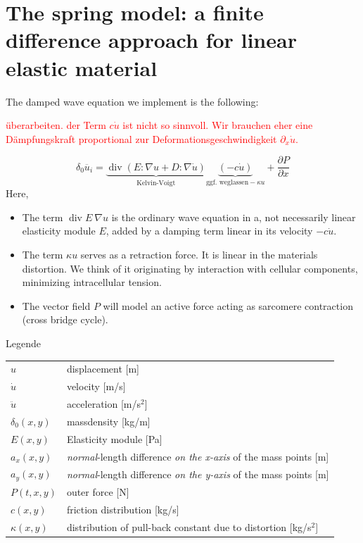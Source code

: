 \chapter{The spring model: a finite difference approach for linear elastic material}
The damped wave equation we implement is the following:

\textcolor{red}{überarbeiten. der Term $c \dot{u}$ ist nicht so sinnvoll. Wir brauchen eher eine Dämpfungskraft proportional zur Deformationsgeschwindigkeit $\partial_x \dot{u}$.}

\begin{equation*}
	\delta_0 \ddot{u_i} = \underbrace{\operatorname{div} (E: \nabla u + D :\nabla \dot{u})}_{\text{Kelvin-Voigt}} \underbrace{( - c \dot{u})}_{\text{ggf. weglassen} - \kappa u} + \frac{\partial P}{\partial x}
\end{equation*}
Here,
\begin{itemize}
	\item The term $ \operatorname{div} E \  \nabla u$ is the ordinary wave equation in a, not necessarily linear elasticity module $E$, added by a damping term linear in its velocity $- c \dot{u}$.
	\item The term $\kappa u$ serves as a retraction force. It is linear in the materials distortion. We think of it originating by interaction with cellular components, minimizing intracellular tension.
	\item The vector field $P$ will model an active force acting as sarcomere contraction (cross bridge cycle).
\end{itemize}

\newpage
Legende \newline

\noindent
\begin{tabular}{ll}
	$u$ & displacement [m] \\
	$\dot{u}$ & velocity [m/s] \\
	$\ddot{u}$ & acceleration [m/s$^2$] \\
	$\delta_0(x,y)$ & massdensity [kg/m] \\
	$E(x,y)$ & Elasticity module [Pa] \\
	$a_x(x,y)$ & \textit{normal}-length difference \textit{on the x-axis} of the mass points [m] \\
	$a_y(x,y)$ & \textit{normal}-length difference \textit{on the y-axis} of the mass points [m] \\
	$P(t,x,y)$ & outer force [N] \\
	$c(x,y)$ & friction distribution [kg/s] \\
	$\kappa(x,y)$ & distribution of pull-back constant due to distortion [kg/s$^2$] \\
\end{tabular}


